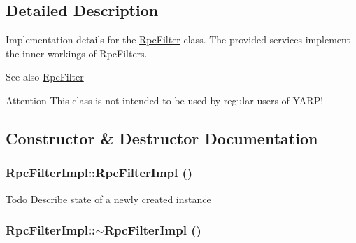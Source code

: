 \subsection{Detailed Description}
Implementation details for the {\ttfamily \hyperlink{classyarp_1_1os_1_1_rpc_filter}{RpcFilter}} class. The provided services implement the inner workings of RpcFilters.

\begin{DoxySeeAlso}{See also}
\hyperlink{classyarp_1_1os_1_1_rpc_filter}{RpcFilter}
\end{DoxySeeAlso}
\begin{DoxyAttention}{Attention}
This class is not intended to be used by regular users of YARP! 
\end{DoxyAttention}


\subsection{Constructor \& Destructor Documentation}
\hypertarget{classyarp_1_1os_1_1impl_1_1_rpc_filter_impl_a15ed48bd9dfa1d97e242ea54b7d17977}{
\subsubsection[{RpcFilterImpl}]{\setlength{\rightskip}{0pt plus 5cm}RpcFilterImpl::RpcFilterImpl ()}}
\label{classyarp_1_1os_1_1impl_1_1_rpc_filter_impl_a15ed48bd9dfa1d97e242ea54b7d17977}
\begin{Desc}
\item[\hyperlink{todo__todo000001}{Todo}]Describe state of a newly created instance \end{Desc}
\hypertarget{classyarp_1_1os_1_1impl_1_1_rpc_filter_impl_af0b70bf356655fd2de7133532798faf0}{
\subsubsection[{$\sim$RpcFilterImpl}]{\setlength{\rightskip}{0pt plus 5cm}RpcFilterImpl::$\sim$RpcFilterImpl ()}}
\label{classyarp_1_1os_1_1impl_1_1_rpc_filter_impl_af0b70bf356655fd2de7133532798faf0}


